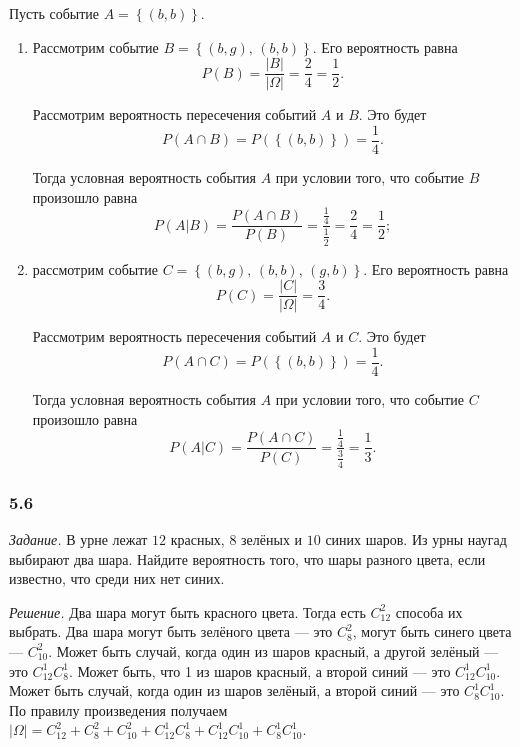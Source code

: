 Пусть событие $A = \left\{ \left( b, b \right) \right\} $.

\begin{enumerate}[label=\alph*)]
\item Рассмотрим событие $B = \left\{ \left( b, g \right), \, \left(b, b \right) \right\} $.
Его вероятность равна
$$P \left( B \right) =
\frac{ \left| B \right| }{ \left| \Omega \right| } =
\frac{2}{4} =
\frac{1}{2}.$$

Рассмотрим вероятность пересечения событий $A$ и $B$.
Это будет
$$P \left( A \cap B \right) =
P \left( \left\{ \left( b, b \right) \right\} \right) =
\frac{1}{4}.$$

Тогда условная вероятность события $A$ при условии того, что событие $B$ произошло равна
$$P \left( \left. A \right| B \right) =
\frac{P \left( A \cap B \right) }{P \left( B \right) } =
\frac{ \frac{1}{4} }{ \frac{1}{2} } =
\frac{2}{4} =
\frac{1}{2};$$ 
\item рассмотрим событие $C = \left\{ \left( b, g \right), \, \left(b, b \right), \, \left( g, b \right) \right\} $.
Его вероятность равна
$$P \left( C \right) =
\frac{ \left| C \right| }{ \left| \Omega \right| } =
\frac{3}{4}.$$

Рассмотрим вероятность пересечения событий $A$ и $C$.
Это будет
$$P \left( A \cap C \right) =
P \left( \left\{ \left( b, b \right) \right\} \right) =
\frac{1}{4}.$$

Тогда условная вероятность события $A$ при условии того, что событие $C$ произошло равна
$$P \left( \left. A \right| C \right) =
\frac{P \left( A \cap C \right) }{P \left( C \right) } =
\frac{ \frac{1}{4} }{ \frac{3}{4} } =
\frac{1}{3}.$$ 
\end{enumerate}

\subsubsection*{5.6}
 
\textit{Задание.} В урне лежат $12$ красных, $8$ зелёных и $10$ синих шаров.
Из урны наугад выбирают два шара.
Найдите вероятность того, что шары разного цвета, если известно, что среди них нет синих.

\textit{Решение.} Два шара могут быть красного цвета.
Тогда есть $C_{12}^2$ способа их выбрать.
Два шара могут быть зелёного цвета --- это $C_8^2$, могут быть синего цвета --- $C_{10}^2$.
Может быть случай, когда один из шаров красный, а другой зелёный --- это $C_{12}^1 C_8^1$.
Может быть, что 1 из шаров красный, а второй синий --- это $C_{12}^1 C_{10}^1$.
Может быть случай, когда один из шаров зелёный, а второй синий --- это $C_8^1 C_{10}^1$.
По правилу произведения получаем $ \left| \Omega \right| = C_{12}^2 + C_8^2 + C_{10}^2 + C_{12}^1 C_8^1 + C_{12}^1 C_{10}^1 + C_8^1 C_{10}^1$.

